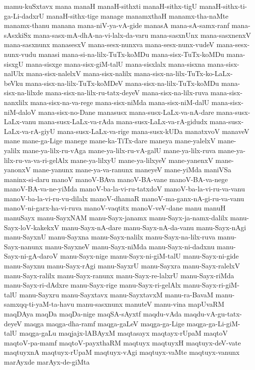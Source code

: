 {mamu-kuSxtavx
mana
manaH
manaH-sithxti
manaH-sithx-tigU
manaH-sithx-ti-ga-Li-dadxrU
manaH-sithx-tige
manage
manamxthaH
manamx-tha-naMte
manamx-thanu
manana
mana-niV-ya-vA-gide
manasA
mana-sA-samx-ranf
mana-sAsxkiSx
mana-sasx-mA-dhA-na-vi-lalx-da-varu
mana-sasxnUnx
mana-sasxnenxV
mana-sasxnunx
manasesxV
mana-sesx-nunxva
mana-sesx-nunx-vudeV
mana-sesx-nunx-vudu
manasi
mana-si-na-lilx-TuTx-koMDu
mana-sisx-TuTx-koMDu
mana-sisxgU
mana-sisxge
mana-sisx-giM-talU
mana-sisxlalx
mana-sisxna
mana-sisx-nalUlx
mana-sisx-nalelxV
mana-sisx-nalilx
mana-sisx-na-lilx-TuTx-ko-LaLx-beVku
mana-sisx-na-lilx-TuTx-koMDeV
mana-sisx-na-lilx-TuTx-koMDu
mana-sisx-na-lilxde
mana-sisx-na-lilx-ru-tatx-deyeV
mana-sisx-na-lilx-ruva
mana-sisx-nanxlilx
mana-sisx-na-va-rege
mana-sisx-niMda
mana-sisx-niM-dalU
mana-sisx-niM-daloV
mana-sisx-no-Dane
manasusx
mana-susx-LaLx-va-nA-dare
mana-susx-LaLx-vanu
mana-susx-LaLx-va-rAda
mana-susx-LaLx-va-rA-gidudx
mana-susx-LaLx-va-rA-giyU
mana-susx-LaLx-va-rige
mana-susx-kUDa
manatxvoV
manaveV
mane
mane-ga-Lige
manege
mane-ka-TiTx-dare
maneya
mane-yalelxV
mane-yalilx
mane-ya-lilx-ru-vAga
mane-ya-lilx-ru-vA-galU
mane-ya-lilx-ruva
mane-ya-lilx-ru-va-va-ri-gelAlx
mane-ya-lilxyU
mane-ya-lilxyeV
mane-yanenxV
mane-yanonxV
mane-yanunx
mane-ya-va-ranunx
maneyeV
mane-yiMda
maniVSa
maninx-si-daru
manoV
manoV-BAva
manoV-BA-vane
manoV-BA-va-nege
manoV-BA-va-ne-yiMda
manoV-ba-la-vi-ru-tatxdoV
manoV-ba-la-vi-ru-va-vanu
manoV-ba-la-vi-ru-vu-dilalx
manoV-dhamaR
manoV-ma-ganx-nA-gi-ru-va-vanu
manoV-ni-garx-ha-vi-ruva
manoV-vaqtitx
manoV-veV-dane
manu
manuH
manuSayx
manu-SayxNAM
manu-Sayx-janamx
manu-Sayx-ja-namx-dalilx
manu-Sayx-loV-kakekxV
manu-Sayx-nA-dare
manu-Sayx-nA-da-vanu
manu-Sayx-nAgi
manu-SayxnU
manu-Sayxna
manu-Sayx-nalilx
manu-Sayx-na-lilx-ruva
manu-Sayx-nanunx
manu-SayxneV
manu-Sayx-niMda
manu-Sayx-ni-dadxnu
manu-Sayx-ni-gA-daroV
manu-Sayx-nige
manu-Sayx-ni-giM-talU
manu-Sayx-ni-gide
manu-Sayxnu
manu-Sayx-rAgi
manu-SayxrU
manu-Sayxra
manu-Sayx-ralelxV
manu-Sayx-ralilx
manu-Sayx-ranunx
manu-Sayx-re-lalxrU
manu-Sayx-riMda
manu-Sayx-ri-dAdxre
manu-Sayx-rige
manu-Sayx-ri-gelAlx
manu-Sayx-ri-giM-talU
manu-Sayxru
manu-Sayxtavx
manu-SayxtavxM
manu-ra-BavaM
manu-samxqq-ti-yaM-ta-havu
manu-sasxnunx
manuteV
manu-vina
mapUvaRM
maqDAya
maqDa
maqDa-nige
maqSA-sAyxtf
maqdu-vAda
maqdu-vA-gu-tatx-deyeV
maqga
maqga-dha-ramf
maqga-gaLeV
maqga-ga-Lige
maqga-ga-Li-giM-talU
maqga-gaLu
maqjajx-lABAyxM
maqtasayx
maqtayx-rUpaM
maqtoV
maqtoV-pa-mamf
maqtoV-payxthaRM
maqtuyx
maqtuyxH
maqtuyx-deV-vate
maqtuyxnA
maqtuyx-rUpaM
maqtuyx-vAgi
maqtuyx-vaMte
maqtuyx-vanunx
marAyxde
marAyx-de-giMta
}
